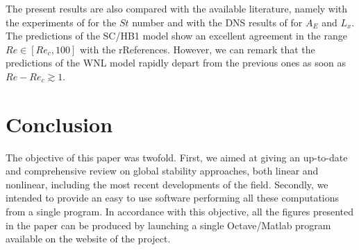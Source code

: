 \documentclass[twocolumn,10pt]{asme2ej}
\begin{document}

The present results are also compared with the available literature, namely with the experiments of \cite{williamson1988defining} for the $St$ number and  with the DNS results of \cite{MLugo2014} for $A_E$ and $L_x$.
The predictions of the SC/HB1 model show an excellent agreement in the range $Re \in [Re_c,100]$ with the rReferences. %
However, we can remark that the predictions of the WNL model rapidly depart from the previous ones as soon as $Re-Re_c \gtrsim 1$.





\section{Conclusion}


The objective of this paper was twofold. First, we aimed at giving an up-to-date and comprehensive review on global stability approaches, both linear and nonlinear, including the most recent developments of the field. 
Secondly, we intended to provide an easy to use software performing all these computations from a single program. In accordance with this objective, all the figures presented in the paper can be produced by launching a single Octave/Matlab program available on the website of the project.
\end{document}
